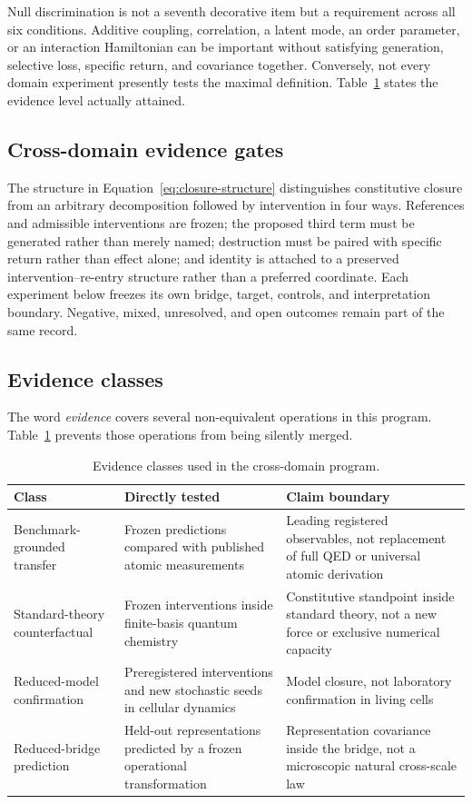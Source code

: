 \documentclass[11pt,a4paper]{article}
\begin{document}
Null discrimination is not a seventh decorative item but a requirement across all six conditions. Additive coupling, correlation, a latent mode, an order parameter, or an interaction Hamiltonian can be important without satisfying generation, selective loss, specific return, and covariance together. Conversely, not every domain experiment presently tests the maximal definition. Table~\ref{tab:evidence-classes} states the evidence level actually attained.

\subsection{Cross-domain evidence gates}

The structure in Equation~\eqref{eq:closure-structure} distinguishes constitutive closure from an arbitrary decomposition followed by intervention in four ways. References and admissible interventions are frozen; the proposed third term must be generated rather than merely named; destruction must be paired with specific return rather than effect alone; and identity is attached to a preserved intervention--re-entry structure rather than a preferred coordinate. Each experiment below freezes its own bridge, target, controls, and interpretation boundary. Negative, mixed, unresolved, and open outcomes remain part of the same record.

\subsection{Evidence classes}

The word \emph{evidence} covers several non-equivalent operations in this program. Table~\ref{tab:evidence-classes} prevents those operations from being silently merged.

\begin{table}[H]
\centering
\footnotesize
\caption{Evidence classes used in the cross-domain program.}
\label{tab:evidence-classes}
\begin{tabularx}{\textwidth}{@{}>{\raggedright\arraybackslash}p{2.8cm}>{\raggedright\arraybackslash}X>{\raggedright\arraybackslash}p{4.1cm}@{}}
\toprule
Class & Directly tested & Claim boundary \\
\midrule
Benchmark-grounded transfer & Frozen predictions compared with published atomic measurements & Leading registered observables, not replacement of full QED or universal atomic derivation \\
Standard-theory counterfactual & Frozen interventions inside finite-basis quantum chemistry & Constitutive standpoint inside standard theory, not a new force or exclusive numerical capacity \\
Reduced-model confirmation & Preregistered interventions and new stochastic seeds in cellular dynamics & Model closure, not laboratory confirmation in living cells \\
Reduced-bridge prediction & Held-out representations predicted by a frozen operational transformation & Representation covariance inside the bridge, not a microscopic natural cross-scale law \\
\bottomrule
\end{tabularx}
\end{table}
\end{document}
